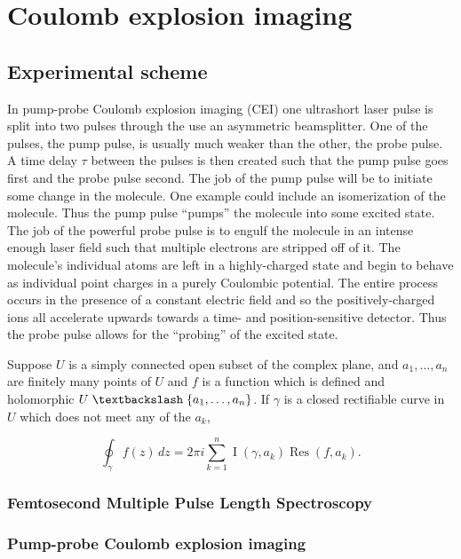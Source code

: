 \chapter{Coulomb explosion imaging}\label{ch:CEI}

\section{Experimental scheme}
In pump-probe Coulomb explosion imaging (CEI) one ultrashort laser pulse is split into two pulses through the use an asymmetric beamsplitter. One of the pulses, the pump pulse, is usually much weaker than the other, the probe pulse. A time delay $\tau$ between the pulses is then created such that the pump pulse goes first and the probe pulse second. The job of the pump pulse will be to initiate some change in the molecule. One example could include an isomerization of the molecule. Thus the pump pulse ``pumps'' the molecule into some excited state. The job of the powerful probe pulse is to engulf the molecule in an intense enough laser field such that multiple electrons are stripped off of it. The molecule's individual atoms are left in a highly-charged state and begin to behave as individual point charges in a purely Coulombic potential. The entire process occurs in the presence of a constant electric field and so the positively-charged ions all accelerate upwards towards a time- and position-sensitive detector. Thus the probe pulse allows for the ``probing'' of the excited state.

Suppose $U$ is a simply connected open subset of the complex plane, and $a_1,\dots,a_n$ are finitely many points of $U$ and $f$ is a function which is defined and holomorphic $U \; \textbackslash \; \{ a_1,\dots,a_n \}$. If $\gamma$ is a closed rectifiable curve in $U$ which does not meet any of the $a_k$,

\begin{equation}
\oint_\gamma f(z)\, dz = 2\pi i \sum_{k=1}^n \operatorname{I}(\gamma, a_k)  \operatorname{Res}( f, a_k ).
\end{equation}

\subsection{Femtosecond Multiple Pulse Length Spectroscopy}
\subsection{Pump-probe Coulomb explosion imaging}

